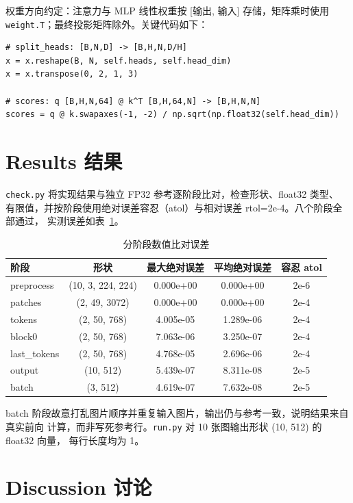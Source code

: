 \documentclass[a4paper,12pt]{article}
\begin{document}
权重方向约定：注意力与 MLP 线性权重按 [输出, 输入] 存储，矩阵乘时使用
\texttt{weight.T}；最终投影矩阵除外。关键代码如下：

\begin{verbatim}
# split_heads: [B,N,D] -> [B,H,N,D/H]
x = x.reshape(B, N, self.heads, self.head_dim)
x = x.transpose(0, 2, 1, 3)

# scores: q [B,H,N,64] @ k^T [B,H,64,N] -> [B,H,N,N]
scores = q @ k.swapaxes(-1, -2) / np.sqrt(np.float32(self.head_dim))
\end{verbatim}

\section{Results 结果}

\texttt{check.py} 将实现结果与独立 FP32 参考逐阶段比对，检查形状、float32 类型、
有限值，并按阶段使用绝对误差容忍（atol）与相对误差 rtol=2e-4。八个阶段全部通过，
实测误差如表~\ref{tab:errors}。

\begin{table}[H]
    \centering
    \begin{tabular}{lcccc}
        \hline
        阶段 & 形状 & 最大绝对误差 & 平均绝对误差 & 容忍 atol \\
        \hline
        preprocess   & (10, 3, 224, 224) & 0.000e+00 & 0.000e+00 & 2e-6 \\
        patches      & (2, 49, 3072)     & 0.000e+00 & 0.000e+00 & 2e-4 \\
        tokens       & (2, 50, 768)      & 4.005e-05 & 1.289e-06 & 2e-4 \\
        block0       & (2, 50, 768)      & 7.063e-06 & 3.250e-07 & 2e-4 \\
        last\_tokens & (2, 50, 768)      & 4.768e-05 & 2.696e-06 & 2e-4 \\
        output       & (10, 512)         & 5.439e-07 & 8.311e-08 & 2e-5 \\
        batch        & (3, 512)          & 4.619e-07 & 7.632e-08 & 2e-5 \\
        \hline
    \end{tabular}
    \caption{分阶段数值比对误差}
    \label{tab:errors}
\end{table}

batch 阶段故意打乱图片顺序并重复输入图片，输出仍与参考一致，说明结果来自真实前向
计算，而非写死参考行。\texttt{run.py} 对 10 张图输出形状 (10, 512) 的 float32 向量，
每行长度均为 1。

\section{Discussion 讨论}
\end{document}
